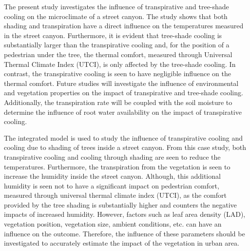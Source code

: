 The present study investigates the influence of transpirative and tree-shade cooling on the microclimate of a street canyon. The study shows that both shading and transpiration have a direct influence on the temperatures measured in the street canyon. Furthermore, it is evident that tree-shade cooling is substantially larger than the transpirative cooling and, for the position of a pedestrian under the tree, the thermal comfort, measured through Universal Thermal Climate Index (UTCI), is only affected by the tree-shade cooling. In contrast, the transpirative cooling is seen to have negligible influence on the thermal comfort. Future studies will investigate the influence of environmental and vegetation properties on the impact of transpirative and tree-shade cooling. Additionally, the transpiration rate will be coupled with the soil moisture to determine the influence of root water availability on the impact of transpirative cooling.

The integrated model is used to study the influence of transpirative cooling and cooling due to shading of trees inside a street canyon. From this case study, both transpirative cooling and cooling through shading are seen to reduce the temperatures. Furthermore, the transpiration from the vegetation is seen to increase the humidity inside the street canyon. Although, this additional humidity is seen not to have a significant impact on pedestrian comfort, measured through universal thermal climate index (UTCI), as the comfort provided by the tree shading is substantially higher and counters the negative impacts of increased humidity. However, factors such as leaf area density (LAD), vegetation position, vegetation size, ambient conditions, etc. can have an influence on the outcome. Therefore, the influence of these parameters should be investigated to accurately estimate the impact of the vegetation in urban area.  
%
%
%
%
